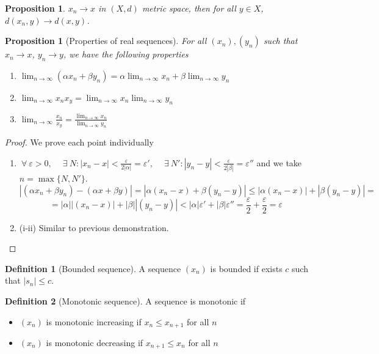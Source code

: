 \documentclass{article}
\newcommand{\DS}{\displaystyle}
\newcommand{\abs}[1]{\left|#1\right|}
\newenvironment{enumrom}{\begin{enumerate}[label=(\roman*)]}{\end{enumerate}}
\newcommand{\fr}[2]{\frac{#1}{#2}}
\newcommand{\limn}{\lim_{n \to \infty}}
\theoremstyle{definition}
\newtheorem{definition}{Definition}[section]
\theoremstyle{definition}
\theoremstyle{plain}
\theoremstyle{plain}
\theoremstyle{plain}
\theoremstyle{plain}
\newtheorem{proposition}[theorem]{Proposition}
\theoremstyle{definition}
\theoremstyle{remark}
\theoremstyle{remark}
\theoremstyle{remark}
\theoremstyle{remark}
\newcommand{\ForAll}{\ \forall \ }
\newcommand{\Exists}{\ \exists \ }
\newcommand{\E}{\varepsilon}
\begin{document}
\begin{proposition}
  $x_n \to x$ in $(X,d)$ metric space, then for all $y \in X$, $d(x_n,y) \to d(x,y)$.
\end{proposition}


\begin{proposition}[Properties of real sequences]
  For all $(x_n), (y_n)$ such that $x_n \to x$, $y_n \to y$, we have the following properties
  \begin{enumrom}
  \item $\DS \limn (\alpha x_n + \beta y_n) = \alpha \limn x_n + \beta \limn y_n$
  \item $\DS \limn x_n x_y = \limn x_n \limn y_n$
  \item $\DS \limn \fr{x_n}{x_y} = \fr{\limn x_n}{\limn y_n}$
  \end{enumrom}
\end{proposition}

\begin{proof} We prove each point individually
  \begin{enumrom}
  \item $\DS \ForAll \E > 0, \quad \Exists N : \abs{x_n - x} < \fr{\E}{2\abs{\alpha}} = \E', \quad \Exists N' : \abs{y_n - y} < \fr{\E}{2\abs{\beta}} = \E'' $ and we take $ n = \max \{ N, N'\} $.
    \[
    \abs{(\alpha x_n + \beta y_n) - (\alpha x + \beta y)} =
    \abs{\alpha (x_n - x) + \beta (y_n - y)} \leq
    \abs{\alpha (x_n - x)} + \abs{\beta (y_n - y)} =
    \]
    \[ =
    \abs{\alpha} \abs{(x_n - x)} + \abs{\beta} \abs{(y_n - y)} <
    \abs{\alpha} \E' + \abs{\beta} \E'' =
    \fr{\E}{2} + \fr{\E}{2} =
    \E
    \]
  \item[(i-ii)] Similar to previous demonstration.
  \end{enumrom}
\end{proof}




\begin{definition}[Bounded sequence]
  A sequence $(x_n)$ is bounded if exists $c$ such that $\abs{s_n} \leq c$.
\end{definition}





\begin{definition}[Monotonic sequence]
  A sequence is monotonic if
  \begin{itemize}
    \item $(x_n)$ is monotonic increasing if $x_n \leq x_{n+1}$ for all $n$
    \item $(x_n)$ is monotonic decreasing if $x_{n+1} \leq x_n$ for all $n$
  \end{itemize}
\end{definition}
\end{document}
